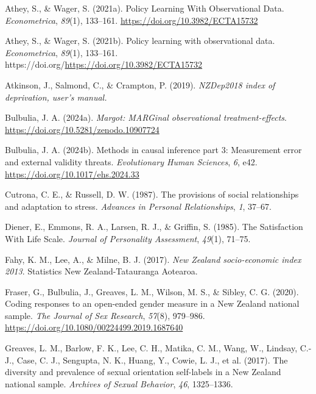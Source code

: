 \documentclass[
  single column]{article}
\newlength{\cslhangindent}
\newenvironment{CSLReferences}[2] %
 {\begin{list}{}{%
  \setlength{\itemindent}{0pt}
  \setlength{\leftmargin}{0pt}
  \setlength{\parsep}{0pt}
  \ifodd #1
   \setlength{\leftmargin}{\cslhangindent}
   \setlength{\itemindent}{-1\cslhangindent}
  \fi
  \setlength{\itemsep}{#2\baselineskip}}}
 {\end{list}}
\begin{document}
\label{refs}
\begin{CSLReferences}{1}{0}
Athey, S., \& Wager, S. (2021a). Policy Learning With Observational
Data. \emph{Econometrica}, \emph{89}(1), 133--161.
\url{https://doi.org/10.3982/ECTA15732}

Athey, S., \& Wager, S. (2021b). Policy learning with observational
data. \emph{Econometrica}, \emph{89}(1), 133--161.
https://doi.org/\url{https://doi.org/10.3982/ECTA15732}

Atkinson, J., Salmond, C., \& Crampton, P. (2019). \emph{NZDep2018 index
of deprivation, user{'}s manual.}

Bulbulia, J. A. (2024a). \emph{Margot: MARGinal observational
treatment-effects}. \url{https://doi.org/10.5281/zenodo.10907724}

Bulbulia, J. A. (2024b). Methods in causal inference part 3: Measurement
error and external validity threats. \emph{Evolutionary Human Sciences},
\emph{6}, e42. \url{https://doi.org/10.1017/ehs.2024.33}

Cutrona, C. E., \& Russell, D. W. (1987). The provisions of social
relationships and adaptation to stress. \emph{Advances in Personal
Relationships}, \emph{1}, 37--67.

Diener, E., Emmons, R. A., Larsen, R. J., \& Griffin, S. (1985). The
Satisfaction With Life Scale. \emph{Journal of Personality Assessment},
\emph{49}(1), 71--75.

Fahy, K. M., Lee, A., \& Milne, B. J. (2017). \emph{{N}ew {Z}ealand
socio-economic index 2013}. Statistics New Zealand-Tatauranga Aotearoa.

Fraser, G., Bulbulia, J., Greaves, L. M., Wilson, M. S., \& Sibley, C.
G. (2020). Coding responses to an open-ended gender measure in a {N}ew
{Z}ealand national sample. \emph{The Journal of Sex Research},
\emph{57}(8), 979--986.
\url{https://doi.org/10.1080/00224499.2019.1687640}

Greaves, L. M., Barlow, F. K., Lee, C. H., Matika, C. M., Wang, W.,
Lindsay, C.-J., Case, C. J., Sengupta, N. K., Huang, Y., Cowie, L. J.,
et al. (2017). The diversity and prevalence of sexual orientation
self-labels in a {N}ew {Z}ealand national sample. \emph{Archives of
Sexual Behavior}, \emph{46}, 1325--1336.


\end{CSLReferences}
\end{document}
